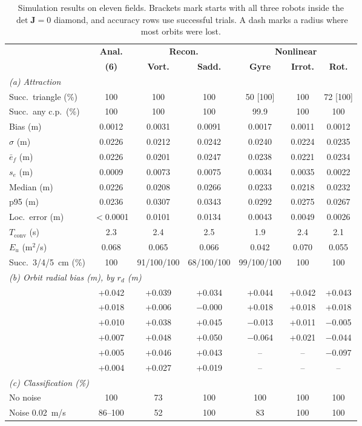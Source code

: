 \documentclass[lettersize,journal]{IEEEtran}
\newcommand{\rev}[1]{#1}
\begin{document}
\begin{table}[!t]
\scriptsize
\centering
\caption{Simulation results on eleven fields. Brackets mark starts with all three robots inside the $\det\mathbf{J} = 0$ diamond, and accuracy rows use successful trials. A dash marks a radius where most orbits were lost.}
\label{tab:simulation_results}
\setlength{\tabcolsep}{1.3pt}
\rev{\begin{tabular}{l|c|cc|ccc}
\hline
 & \textbf{Anal.} & \multicolumn{2}{c|}{\textbf{Recon.}} & \multicolumn{3}{c}{\textbf{Nonlinear}} \\
 & \textbf{(6)} & \textbf{Vort.} & \textbf{Sadd.} & \textbf{Gyre} & \textbf{Irrot.} & \textbf{Rot.} \\
\hline
\multicolumn{7}{l}{\textit{(a) Attraction}} \\
\hline
Succ.\ triangle (\%) & 100 & 100 & 100 & 50 [100] & 100 & 72 [100] \\
Succ.\ any c.p.\ (\%) & 100 & 100 & 100 & 99.9 & 100 & 100 \\
Bias (m) & 0.0012 & 0.0031 & 0.0091 & 0.0017 & 0.0011 & 0.0012 \\
$\sigma$ (m) & 0.0226 & 0.0212 & 0.0242 & 0.0240 & 0.0224 & 0.0235 \\
$\bar{e}_f$ (m) & 0.0226 & 0.0201 & 0.0247 & 0.0238 & 0.0221 & 0.0234 \\
$s_e$ (m) & 0.0009 & 0.0073 & 0.0075 & 0.0034 & 0.0035 & 0.0022 \\
Median (m) & 0.0226 & 0.0208 & 0.0266 & 0.0233 & 0.0218 & 0.0232 \\
p95 (m) & 0.0236 & 0.0307 & 0.0343 & 0.0292 & 0.0275 & 0.0267 \\
Loc.\ error (m) & $<$0.0001 & 0.0101 & 0.0134 & 0.0043 & 0.0049 & 0.0026 \\
$T_{\mathrm{conv}}$ (s) & 2.3 & 2.4 & 2.5 & 1.9 & 2.4 & 2.1 \\
$E_u$ (m$^2$/s) & 0.068 & 0.065 & 0.066 & 0.042 & 0.070 & 0.055 \\
Succ.\ 3/4/5~cm (\%) & 100 & 91/100/100 & 68/100/100 & 99/100/100 & 100 & 100 \\
\hline
\multicolumn{7}{l}{\textit{(b) Orbit radial bias (m), by $r_d$ (m)}} \\
\hline
\quad 0.01 & +0.042 & +0.039 & +0.034 & +0.044 & +0.042 & +0.043 \\
\quad 0.10 & +0.018 & +0.006 & $-$0.000 & +0.018 & +0.018 & +0.018 \\
\quad 0.20 & +0.010 & +0.038 & +0.045 & $-$0.013 & +0.011 & $-$0.005 \\
\quad 0.30 & +0.007 & +0.048 & +0.050 & $-$0.064 & +0.021 & $-$0.044 \\
\quad 0.40 & +0.005 & +0.046 & +0.043 & -- & -- & $-$0.097 \\
\quad 0.50 & +0.004 & +0.027 & +0.019 & -- & -- & -- \\
\hline
\multicolumn{7}{l}{\textit{(c) Classification (\%)}} \\
\hline
No noise & 100 & 73 & 100 & 100 & 100 & 100 \\
Noise 0.02~m/s & 86--100 & 52 & 100 & 83 & 100 & 100 \\
\hline
\end{tabular}}
\end{table}
\end{document}
